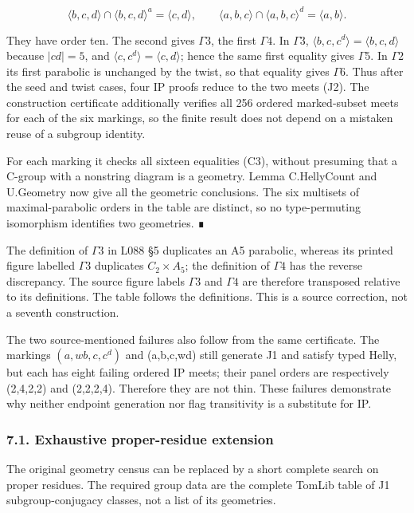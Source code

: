 \documentclass[
  11pt,
  a4paper,
]{article}
\begin{document}
\[
\langle b,c,d\rangle\cap\langle b,c,d\rangle^a=\langle c,d\rangle,
\qquad
\langle a,b,c\rangle\cap\langle a,b,c\rangle^d=\langle a,b\rangle.
\tag{J2}
\]

They have order ten. The second gives \(\Gamma 3\), the first
\(\Gamma 4\). In \(\Gamma 3\),
\(\langle b,c,c^d\rangle =\langle b,c,d\rangle\) because \(|cd|=5\), and
\(\langle c,c^d\rangle =\langle c,d\rangle\); hence the same first
equality gives \(\Gamma 5\). In \(\Gamma 2\) its first parabolic is
unchanged by the twist, so that equality gives \(\Gamma 6\). Thus after
the seed and twist cases, four IP proofs reduce to the two meets (J2).
The construction certificate additionally verifies all 256 ordered
marked-subset meets for each of the six markings, so the finite result
does not depend on a mistaken reuse of a subgroup identity.

For each marking it checks all sixteen equalities (C3), without
presuming that a C-group with a nonstring diagram is a geometry. Lemma
C.HellyCount and U.Geometry now give all the geometric conclusions. The
six multisets of maximal-parabolic orders in the table are distinct, so
no type-permuting isomorphism identifies two geometries. ∎

The definition of \(\Gamma 3\) in L088 §5 duplicates an A5 parabolic,
whereas its printed figure labelled \(\Gamma 3\) duplicates
\(C_{2}\times A_{5}\); the definition of \(\Gamma 4\) has the reverse
discrepancy. The source figure labels \(\Gamma 3\) and \(\Gamma 4\) are
therefore transposed relative to its definitions. The table follows the
definitions. This is a source correction, not a seventh construction.

The two source-mentioned failures also follow from the same certificate.
The markings \((a,wb,c,c^d)\) and (a,b,c,wd) still generate J1 and
satisfy typed Helly, but each has eight failing ordered IP meets; their
panel orders are respectively (2,4,2,2) and (2,2,2,4). Therefore they
are not thin. These failures demonstrate why neither endpoint generation
nor flag transitivity is a substitute for IP.

\subsubsection{7.1. Exhaustive proper-residue
extension}\label{exhaustive-proper-residue-extension}

The original geometry census can be replaced by a short complete search
on proper residues. The required group data are the complete TomLib
table of J1 subgroup-conjugacy classes, not a list of its geometries.
\end{document}
